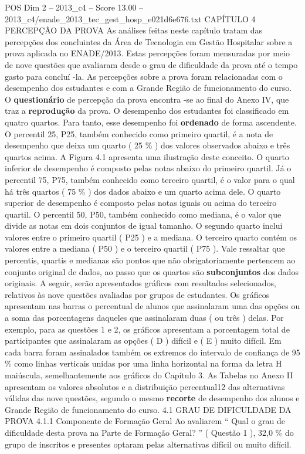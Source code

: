 \begin{textsample}{POS Dim 2 – 2013\_c4 – Score 13.00 – 2013\_c4/enade\_2013\_tec\_gest\_hosp\_e021d6e676.txt}  \label{ex:f2_pos_065}
CAPÍTULO 4 PERCEPÇÃO DA PROVA As análises feitas neste capítulo tratam das percepções dos concluintes da Área de Tecnologia em Gestão Hospitalar sobre a prova aplicada no ENADE/2013.
Estas percepções foram mensuradas por meio de nove questões que avaliaram desde o grau de dificuldade da prova até o tempo gasto para concluí -la.
As percepções sobre a prova foram relacionadas com o desempenho dos estudantes e com a Grande Região de funcionamento do curso.
O \textbf{questionário} de percepção da prova encontra -se ao final do Anexo IV, que traz a \textbf{reprodução} da prova.
O desempenho dos estudantes foi classificado em quatro quartos.
Para tanto, esse desempenho foi \textbf{ordenado} de forma ascendente.
O percentil 25, P25, também conhecido como primeiro quartil, é a nota de desempenho que deixa um quarto ( 25 \% ) dos valores observados abaixo e três quartos acima.
A Figura 4.1 apresenta uma ilustração deste conceito.
O quarto inferior de desempenho é composto pelas notas abaixo do primeiro quartil.
Já o percentil 75, P75, também conhecido como terceiro quartil, é o valor para o qual há três quartos ( 75 \% ) dos dados abaixo e um quarto acima dele.
O quarto superior de desempenho é composto pelas notas iguais ou acima do terceiro quartil.
O percentil 50, P50, também conhecido como mediana, é o valor que divide as notas em dois conjuntos de igual tamanho.
O segundo quarto inclui valores entre o primeiro quartil ( P25 ) e a mediana.
O terceiro quarto contém os valores entre a mediana ( P50 ) e o terceiro quartil ( P75 ).
Vale ressaltar que percentis, quartis e medianas são pontos que não obrigatoriamente pertencem ao conjunto original de dados, ao passo que os quartos são \textbf{subconjuntos} dos dados originais.
A seguir, serão apresentados gráficos com resultados selecionados, relativos às nove questões avaliadas por grupos de estudantes.
Os gráficos apresentam nas barras o percentual de alunos que assinalaram uma das opções ou a soma das porcentagens daqueles que assinalaram duas ( ou três ) delas.
Por exemplo, para as questões 1 e 2, os gráficos apresentam a porcentagem total de participantes que assinalaram as opções ( D ) difícil e ( E ) muito difícil.
Em cada barra foram assinalados também os extremos do intervalo de confiança de 95 \% como linhas verticais unidas por uma linha horizontal na forma da letra H maiúscula, semelhantemente aos gráficos do Capítulo 3.
As Tabelas no Anexo II apresentam os valores absolutos e a distribuição percentual12 das alternativas válidas das nove questões, segundo o mesmo \textbf{recorte} de desempenho dos alunos e Grande Região de funcionamento do curso. 4.1 GRAU DE DIFICULDADE DA PROVA 4.1.1 Componente de Formação Geral Ao avaliarem “ Qual o grau de dificuldade desta prova na Parte de Formação Geral? ” ( Questão 1 ), 32,0 \% do grupo de inscritos e presentes optaram pelas alternativas difícil ou muito difícil.

\end{textsample}
